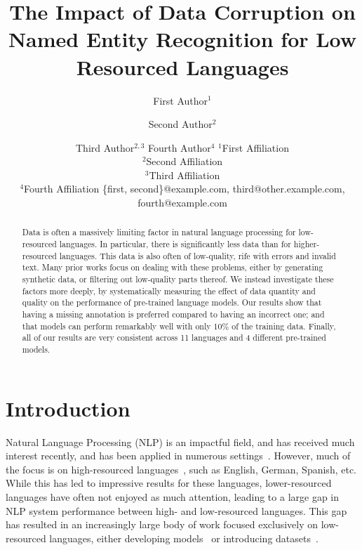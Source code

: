 \documentclass{article}
\title{The Impact of Data Corruption on Named Entity Recognition for Low Resourced Languages}
\author{
First Author$^1$
\and
Second Author$^2$\and
Third Author$^{2,3}$\And    
Fourth Author$^4$
\affiliations
$^1$First Affiliation\\
$^2$Second Affiliation\\
$^3$Third Affiliation\\
$^4$Fourth Affiliation
\emails
\{first, second\}@example.com,
third@other.example.com,
fourth@example.com
}
\begin{document}
\maketitle

\begin{abstract}
Data is often a massively limiting factor in natural language processing for low-resourced languages. In particular, there is significantly less data than for higher-resourced languages. This data is also often of low-quality, rife with errors and invalid text. Many prior works focus on dealing with these problems, either by generating synthetic data, or filtering out low-quality parts thereof. We instead investigate these factors more deeply, by systematically measuring the effect of data quantity and quality on the performance of pre-trained language models. Our results show that having a missing annotation is preferred compared to having an incorrect one; and that models can perform remarkably well with only 10\% of the training data. Finally, all of our results are very consistent across 11 languages and 4 different pre-trained models.

\end{abstract}

\section{Introduction}
Natural Language Processing (NLP) is an impactful field, and has received much interest recently, and has been applied in numerous settings~\citep{vaswani2017Attention,conneau2019Unsupervised}.
However, much of the focus is on high-resourced languages~\citep{vaswani2017Attention,conneau2019Unsupervised,radford2018Improving,radford2019language_gpt2}, such as English, German, Spanish, etc. While this has led to impressive results for these languages, lower-resourced languages have often not enjoyed as much attention, leading to a large gap in NLP system performance between high- and low-resourced languages. This gap has resulted in an increasingly large body of work focused exclusively on low-resourced languages, either developing models~\citep{ogueji2021Small,alabi2022Multilingual} or introducing datasets~\citep{oyewusi2021Naijaner,adelani2021MasakhaNER,adelani2022Thousand,adelani2022Masakhaner}.
\end{document}
